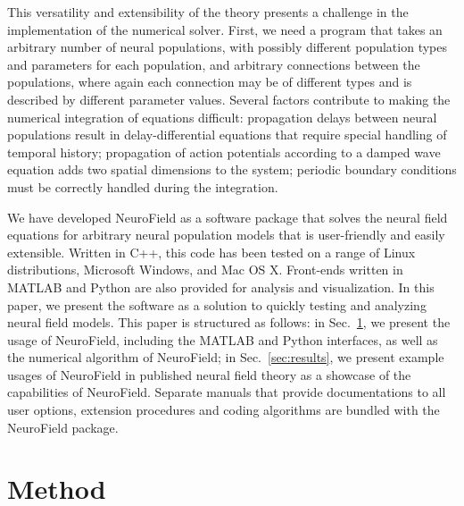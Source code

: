 \documentclass[preprint,review,10pt,authoryear,letterpaper]{elsarticle}
\begin{document}
This versatility and extensibility of the theory presents a challenge in the implementation of the numerical solver. First, we need a program that takes an arbitrary number of neural populations, with possibly different population types and parameters for each population, and arbitrary connections between the populations, where again each connection may be of different types and is described by different parameter values. Several factors contribute to making the numerical integration of equations difficult: propagation delays between neural populations result in delay-differential equations that require special handling of temporal history; propagation of action potentials according to a damped wave equation adds two spatial dimensions to the system; periodic boundary conditions must be correctly handled during the integration. 

We have developed NeuroField as a software package that solves the neural field equations for arbitrary neural population models that is user-friendly and easily extensible. Written in C++, this code has been tested on a range of Linux distributions, Microsoft Windows, and Mac OS X. Front-ends written in MATLAB and Python are also provided for analysis and visualization. In this paper, we present the software as a solution to quickly testing and analyzing neural field models. This paper is structured as follows: in Sec.~\ref{sec:method}, we present the usage of NeuroField, including the MATLAB and Python interfaces, as well as the numerical algorithm of NeuroField; in Sec.~\ref{sec:results}, we present example usages of NeuroField in published neural field theory as a showcase of the capabilities of NeuroField. Separate manuals that provide documentations to all user options, extension procedures and coding algorithms are bundled with the NeuroField package.

\section{Method}
\label{sec:method}
\end{document}
